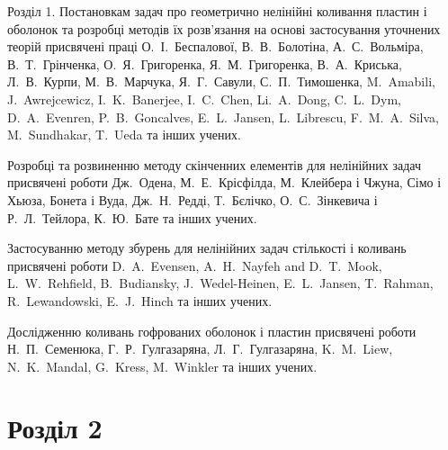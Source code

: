 \documentclass[8pt]{beamer}
\numberwithin{figure}{section}
\numberwithin{equation}{section}
\numberwithin{table}{section}
\begin{document}
\begin{frame}{Розділ 1.}
\medskip
Постановкам задач про  геометрично нелінійні коливання пластин і оболонок та розробці методів їх розв'язання на основі застосування уточнених теорій присвячені праці О.~І.~Беспалової, В.~В.~Болотіна, А.~С.~Вольміра, В.~Т.~Грінченка, О.~Я.~Григоренка, Я.~М.~Григоренка, В.~А.~Криська, Л.~В.~Курпи, М.~В.~Марчука, Я.~Г.~Савули, С.~П.~Тимошенка, M.~Amabili, J.~Awrejcewicz, I.~K.~Banerjee, I.~C.~Chen, Li.~A.~Dong, C.~L.~Dym, D.~A.~Evenren, P.~B.~Goncalves, E.~L.~Jansen, L.~Librescu, F.~M.~A.~Silva, M.~Sundhakar, T.~Ueda та інших учених.

\medskip 
Розробці та розвиненню методу скінченних елементів для нелінійних задач присвячені роботи Дж.~Одена, М.~Е.~Крісфілда, М.~Клейбера і Чжуна, Сімо і Хьюза, Бонета і Вуда, Дж.~Н.~Редді, Т.~Бєлічко, О.~С.~Зінкевича і Р.~Л.~Тейлора, К.~Ю.~Бате та інших учених.

\medskip 
Застосуванню методу збурень для нелінійних задач стількості і коливань присвячені роботи D.~A.~Evensen, A.~H.~Nayfeh and D.~T.~Mook, L.~W.~Rehfield, B.~Budiansky, J.~Wedel-Heinen, E.~L.~Jansen, T.~Rahman, R.~Lewandowski, E.~J.~Hinch та інших учених.

\medskip
Дослідженню коливань гофрованих оболонок і пластин присвячені роботи Н.~П.~Семенюка, Г.~Р.~Гулгазаряна, Л.~Г.~Гулгазаряна, K.~M.~Liew, N.~K.~Mandal, G.~Kress, M.~Winkler та інших учених.


\end{frame}

\section{Розділ 2}
\end{document}
